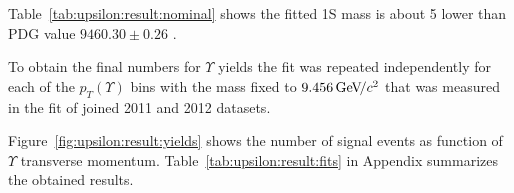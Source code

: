 


Table~\ref{tab:upsilon:result:nominal} shows the fitted \Y1S mass is about
5 \mevcc lower than PDG value $9460.30 \pm  0.26$ \mevcc.

% 


To obtain the final numbers for $\Upsilon$ yields the fit was repeated
independently for each of the $p_T(\Upsilon)$ bins with the \OneS mass 
fixed to $9.456 {\mathrm{\,Ge\kern -0.1em V\!/}c^2}$ that was measured in the fit of joined 2011 and 2012
datasets.

Figure~\ref{fig:upsilon:result:yields} shows the number of signal events as
function of $\Upsilon$ transverse momentum.
Table~\ref{tab:upsilon:result:fits} in Appendix summarizes the obtained results.




% 
% 
% 